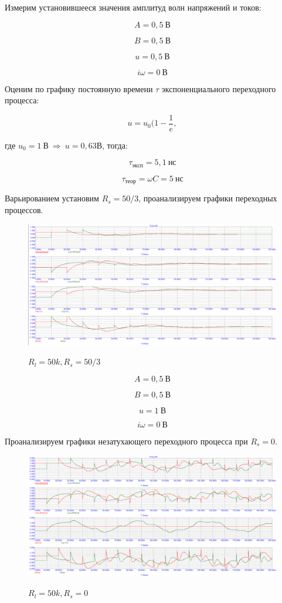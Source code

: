 \documentclass[a4paper, 12pt]{article}%
\begin{document}
Измерим установившееся значения амплитуд волн напряжений и токов:

\[A = 0,5 \: \textit{В}\]

\[B = 0,5 \: \textit{В}\]

\[u = 0,5 \: \textit{В}\]

\[i\omega = 0 \: \textit{В}\]

Оценим по графику постоянную времени $\tau$ экспоненциального переходного процесса:

\[u = u_0 (1 - \frac{1}{e},\]

где $u_0 = 1 \: \textit{В} \: \Rightarrow \: u = 0,63 \textit{В}$, тогда:

\[\tau_{эксп} = 5,1 \: \textit{нс}\]

\[\tau_{теор} = \omega C = 5 \: \textit{нс}\]

Варьированием установим $R_s = 50/3$, проанализируем графики переходных процессов.

\begin{figure}[h!]
\centering
\includegraphics[scale=0.4]{images/Graph16.png}
\label{fig:Image1}
\caption{$R_l = 50k, R_s = 50/3$}
\end{figure}

\[A = 0,5 \: \textit{В}\]

\[B = 0,5 \: \textit{В}\]

\[u = 1 \: \textit{В}\]

\[i\omega = 0 \: \textit{В}\]

Проанализируем графики незатухающего переходного процесса при $R_s = 0$.

\begin{figure}[h!]
\centering
\includegraphics[scale=0.4]{images/Graph17.png}
\label{fig:Image1}
\caption{$R_l = 50k, R_s = 0$}
\end{figure}
\end{document}
